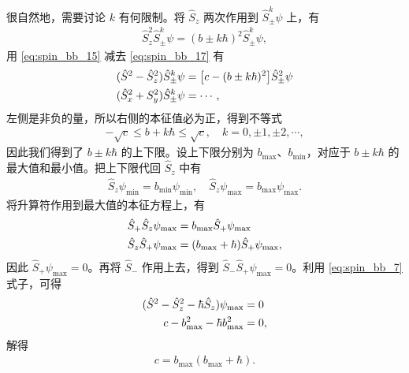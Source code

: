很自然地，需要讨论 $k$ 有何限制。将 $\hat S_z$ 两次作用到 $\hat S_\pm^k \psi$ 上，有
\begin{align}
    \hat S_z^2 \hat S_\pm^k \psi = (b \pm k\hbar)^2 \hat S_\pm^k \psi, 
    \label{eq:spin_bb_17}
\end{align}
用 \eqref{eq:spin_bb_15} 减去 \eqref{eq:spin_bb_17} 有
\begin{align}
    (\hat S^2 - \hat S_z^2) \hat S_\pm^k \psi &= \bigl[
        c - (b \pm k\hbar)^2
    \bigr] \hat S_\pm^2 \psi \notag \\
    (\hat S_x^2 + S_y^2) \hat S_\pm^k \psi &= \cdots, 
\end{align}
左侧是非负的量，所以右侧的本征值必为正，得到不等式
\begin{align}
    -\sqrt c \leqslant b + k\hbar \leqslant \sqrt c, \quad k=0, \pm1, \pm2, \cdots, 
\end{align}
因此我们得到了 $b \pm k\hbar$ 的上下限。设上下限分别为 $b_{\text{max}}$、$b_{\text{min}}$，对应于 $b\pm k\hbar$ 的最大值和最小值。把上下限代回 $\hat S_z$ 中有
\begin{align}
    \hat S_z \psi_{\text{min}} = b_{\text{min}} \psi_{\text{min}}, \quad 
    \hat S_z \psi_{\text{max}} = b_{\text{max}} \psi_{\text{max}}. 
\end{align}
将升算符作用到最大值的本征方程上，有
\begin{align}
    \hat S_+ \hat S_z \psi_{\text{max}} &= b_{\text{max}} \hat S_+ \psi_{\text{max}} \notag \\
    \hat S_z \hat S_+ \psi_{\text{max}} &= (b_{\text{max}} + \hbar) \hat S_+ \psi_{\text{max}},
\end{align}
因此 $\hat S_+ \psi_\text{max} = 0$。再将 $\hat S_-$ 作用上去，得到 $\hat S_- \hat S_+ \psi_{\text{max}} = 0$。利用 \eqref{eq:spin_bb_7} 式子，可得
\begin{align}
    (\hat S^2 - \hat S_z^2 - \hbar \hat S_z) \psi_\text{max} &=0 \notag \\
    c - b_\text{max}^2 - \hbar b_\text{max}^2 &= 0,
\end{align}
解得
\begin{align}
    c = b_\text{max} (b_\text{max} + \hbar).
    \label{eq:spin_bb_20}
\end{align}
